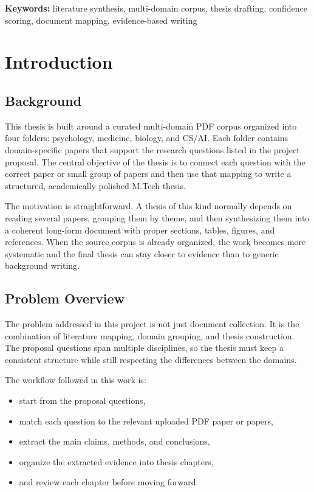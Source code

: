 \documentclass[12pt,a4paper,oneside]{book}
\begin{document}
\textbf{Keywords:} literature synthesis, multi-domain corpus, thesis drafting, confidence scoring, document mapping, evidence-based writing

\tableofcontents
\listoffigures
\listoftables

\mainmatter

\chapter{Introduction}

\section{Background}
This thesis is built around a curated multi-domain PDF corpus organized into four folders: psychology, medicine, biology, and CS/AI. Each folder contains domain-specific papers that support the research questions listed in the project proposal. The central objective of the thesis is to connect each question with the correct paper or small group of papers and then use that mapping to write a structured, academically polished M.Tech thesis.

The motivation is straightforward. A thesis of this kind normally depends on reading several papers, grouping them by theme, and then synthesizing them into a coherent long-form document with proper sections, tables, figures, and references. When the source corpus is already organized, the work becomes more systematic and the final thesis can stay closer to evidence than to generic background writing.

\section{Problem Overview}
The problem addressed in this project is not just document collection. It is the combination of literature mapping, domain grouping, and thesis construction. The proposal questions span multiple disciplines, so the thesis must keep a consistent structure while still respecting the differences between the domains.

The workflow followed in this work is:
\begin{itemize}[leftmargin=*]
  \item start from the proposal questions,
  \item match each question to the relevant uploaded PDF paper or papers,
  \item extract the main claims, methods, and conclusions,
  \item organize the extracted evidence into thesis chapters,
  \item and review each chapter before moving forward.
\end{itemize}
\end{document}
